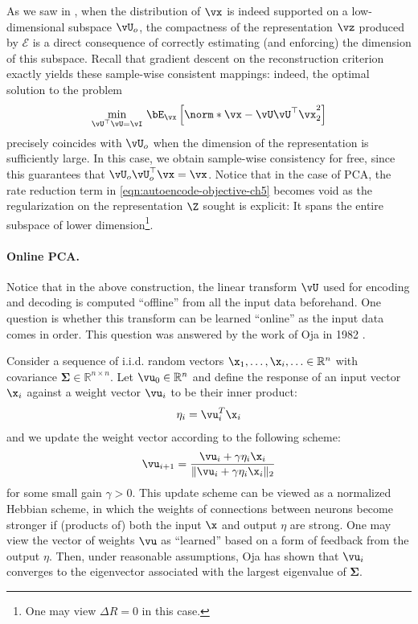 \documentclass[../../book-main.tex]{subfiles}
\begin{document}
As we saw in , when the distribution of $\vx$ is indeed
supported on a low-dimensional subspace $\vU_o$, the compactness of
the representation
$\vz$ produced by $\mathcal{E}$ is a direct consequence of correctly
estimating (and enforcing) the dimension of this subspace.
Recall that gradient descent on the reconstruction criterion exactly
yields these sample-wise consistent mappings: indeed, the optimal
solution to the problem
\begin{equation}\label{eq:pca-reconstruction-ch5}
  \min_{\vU^\top \vU = \vI}\, \bE_{\vx}\left[\norm*{\vx
  - \vU\vU^\top \vx}_2^2\right]
\end{equation}
precisely coincides with $\vU_o$ when the dimension of the representation is
sufficiently large. In this case, we obtain sample-wise consistency
for free, since this guarantees that $\vU_o\vU_o^\top \vx = \vx$.
Notice that in the case of PCA, the rate reduction term in
\eqref{eqn:autoencode-objective-ch5} becomes void as the regularization
on the representation $\Z$ sought is explicit: It spans the entire
subspace of lower dimension\footnote{One may view $\Delta R = 0$ in this case.}.

\paragraph{Online PCA.} 
Notice that in the above construction, the
linear transform $\vU$
used for encoding and decoding is computed ``offline'' from all
the input data beforehand. One question is whether this transform
can be learned ``online'' as the input data comes in order. This
question was answered by the work of Oja in 1982 \cite{Oja1982SimplifiedNM}.
\begin{example} Consider a
  sequence of i.i.d. random vectors $\x_1, \ldots, \x_i, \ldots \in
  \mathbb{R}^n$ with covariance $\boldsymbol{\Sigma} \in
  \mathbb{R}^{n\times n}$. Let $\vu_0 \in \mathbb{R}^n$ and define
  the response of an input vector $\x_i$ against a weight vector
  $\vu_i$ to be their inner product:
  \begin{equation}
    \eta_i = \vu_i^T \x_i
  \end{equation}
  and we update the weight vector according to the following scheme:
  \begin{equation}
    \vu_{i+1} = \frac{\vu_i + \gamma \eta_i \x_i}{\|\vu_i + \gamma
    \eta_i \x_i\|_2}
    \label{eqn:Hebbian}
  \end{equation}
  for some small gain $\gamma >0$. This update scheme can be viewed
  as a normalized Hebbian scheme, in which the weights of connections
  between neurons become stronger if (products of) both the input
  $\x$ and output $\eta$ are strong. One may view the vector of
  weights $\vu$ as ``learned'' based on a form of feedback from the
  output $\eta$.
  Then, under reasonable assumptions, Oja \cite{Oja1982SimplifiedNM} has 
  shown that $\vu_i$ converges to the eigenvector associated with
  the largest eigenvalue of $\boldsymbol{\Sigma}$.
\end{example}
\end{document}
